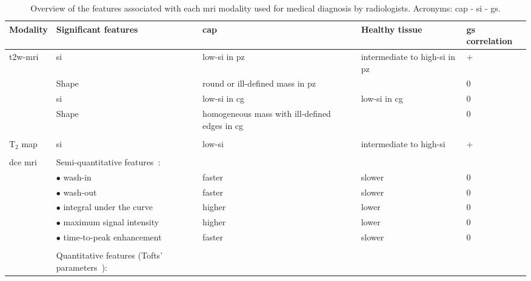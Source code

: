 \begin{table}
  \scriptsize
    \caption[Overview of the features associated with each \acs*{mri} modality
    used for medical diagnosis by radiologists.]{Overview of the features
      associated with each \acs*{mri} modality used for medical diagnosis by
      radiologists. Acronyms: \acf{cap} - \acf{si} -
      \acf{gs}.}\label{tab:modmri}
    \begin{threeparttable}
      \centering
      \noindent
      \begin{tabularx}{\linewidth}{@{} l X X X l @{}}
        \toprule
        \textbf{Modality} & \textbf{Significant features} & \textbf{\acs*{cap}}
        & \textbf{Healthy tissue} & \textbf{\acs*{gs} correlation} \\
        \midrule
        \acs*{t2w}-\acs*{mri} & \acs*{si} & low-\acs*{si} in
        \acs*{pz}~\cite{Hricak1987} & intermediate to high-\acs*{si} in
        \acs*{pz}~\cite{Hricak1987} & +~\cite{Wang2008} \\
        & Shape & round or ill-defined mass in \acs*{pz}~\cite{Hricak1983} &  &
        0 \\
        & \acs*{si} & low-\acs*{si} in \acs*{cg}~\cite{Akin2006,Barentsz2012} &
        low-\acs*{si} in \acs*{cg}~\cite{Akin2006,Barentsz2012} & 0 \\
        & Shape & homogeneous mass with ill-defined edges in \acs*{cg}~\cite{Akin2006, Barentsz2012} &  & 0 \\ \\
        T$_2$ map & \acs*{si} & low-\acs*{si}~\cite{Liney1996,Gibbs2001} &
        intermediate to high-\acs*{si}~\cite{Liney1996,Gibbs2001} &
        +~\cite{Liu2011,Liney1996,Liney1997}  \\ \\
        \acs*{dce} \acs*{mri} & Semi-quantitative features~\cite{Verma2012}: &
        & & \\
        & $\bullet$ wash-in & faster & slower & 0 \\
        & $\bullet$ wash-out & faster & slower & 0 \\
        & $\bullet$ integral under the curve & higher & lower & 0 \\
        & $\bullet$ maximum signal intensity & higher & lower & 0 \\
        & $\bullet$ time-to-peak enhancement & faster & slower & 0 \\ \\
        & Quantitative features (Tofts' parameters~\cite{Tofts2010}): & & & \\

\end{tabularx}
\end{threeparttable}
\end{table}
